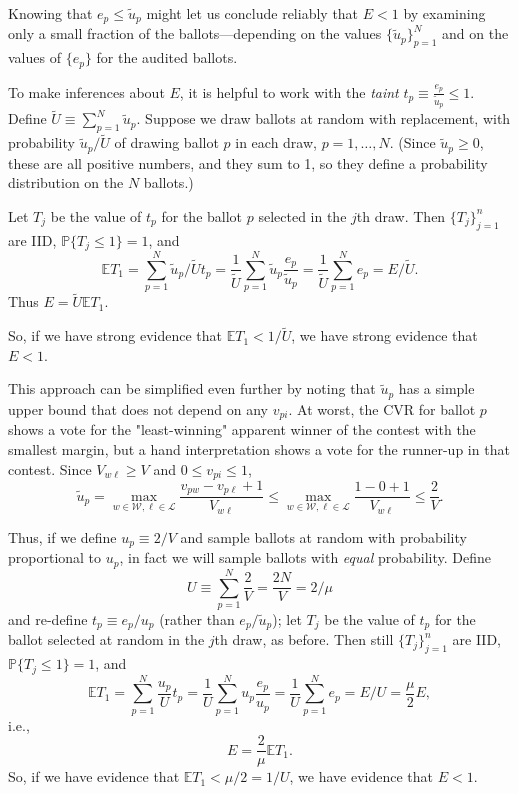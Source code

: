 Knowing that $e_p \le \tilde{u}_p$ might let us conclude reliably that $E < 1$
by examining only a small fraction of the ballots---depending on the 
values $\{ \tilde{u}_p\}_{p=1}^N$ and on the values of $\{e_p\}$ for the audited ballots.

To make inferences about $E$, it is helpful to work with the \emph{taint} $t_p \equiv \frac{e_p}{\tilde{u}_p} \le 1$.
Define $\tilde{U} \equiv \sum_{p=1}^N \tilde{u}_p$.
Suppose we draw ballots at random with replacement, with probability $\tilde{u}_p/\tilde{U}$
of drawing ballot $p$ in each draw, $p = 1, \ldots, N$.
(Since $\tilde{u}_p \ge 0$, these are all positive numbers, and they sum to 1,
so they define a probability distribution on the $N$ ballots.)

Let $T_j$ be the value of $t_p$ for the ballot $p$ selected in the $j$th draw.
Then $\{T_j\}_{j=1}^n$ are IID, $\mathbb{P} \{T_j \le 1\} = 1$, and
$$
  \mathbb{E} T_1 = \sum_{p=1}^N \tilde{u}_p/\tilde{U} t_p =
  \frac{1}{\tilde{U}}\sum_{p=1}^N \tilde{u}_p \frac{e_p}{\tilde{u}_p} = 
  \frac{1}{\tilde{U}} \sum_{p=1}^N e_p = E/\tilde{U}.
$$
Thus $E = \tilde{U} \mathbb{E} T_1$. 

So, if we have strong evidence that
$\mathbb{E} T_1 < 1/\tilde{U}$, we have
strong evidence that $E < 1$.

This approach can be simplified even further by noting that $\tilde{u}_p$ has
a simple upper bound that does not depend on any $v_{pi}$.
At worst, the CVR for ballot $p$ shows a vote for the "least-winning" apparent winner of the contest with the smallest margin, but a hand interpretation shows a vote for the runner-up in
that contest.
Since $V_{w\ell} \ge V$ and $0 \le v_{pi} \le 1$,
$$ 
   \tilde{u}_p =  \max_{w \in \mathcal{W}, \ell \in \mathcal{L}} 
    \frac{v_{pw} - v_{p\ell} + 1}{V_{w\ell}}
    \le  \max_{w \in \mathcal{W}, \ell \in \mathcal{L}} 
    \frac{1 - 0 + 1}{V_{w\ell}}
    \le \frac{2}{V}.
$$

Thus, if we define $u_p \equiv 2/V$ and
sample ballots at random with probability proportional to $u_p$, in fact
we will sample ballots with \emph{equal} probability.
Define
$$ 
   U \equiv \sum_{p=1}^N \frac{2}{V} = \frac{2N}{V} = 2/\mu
$$
and re-define $t_p \equiv e_p/u_p$ (rather than $e_p/\tilde{u}_p$);
let $T_j$ be the value of $t_p$ for the ballot selected at random in the
$j$th draw, as before.
Then still $\{T_j\}_{j=1}^n$ are IID, $\mathbb{P} \{T_j \le 1\} = 1$,
and
$$
  \mathbb{E} T_1 = \sum_{p=1}^N \frac{u_p}{U} t_p =
  \frac{1}{U}\sum_{p=1}^N u_p \frac{e_p}{u_p} = 
  \frac{1}{U} \sum_{p=1}^N e_p = E/U = \frac{\mu}{2} E,
$$
i.e., 
$$ 
    E = \frac{2}{\mu}\mathbb{E} T_1.
$$
So, if we have evidence that $\mathbb{E} T_1 < \mu/2 = 1/U$, we have evidence that 
$E < 1$.